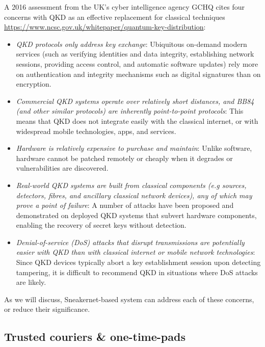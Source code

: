 \documentclass[twocolumn, aps, rmp, amsmath, amssymb, nofootinbib, superscriptaddress, longbibliography, floatfix, table-of-contents, eqsecnum]{revtex4-2}
\begin{document}
A 2016 assessment from the UK's cyber intelligence agency GCHQ cites four concerns with QKD as an effective replacement for classical techniques \href{https://www.ncsc.gov.uk/whitepaper/quantum-key-distribution}{https://www.ncsc.gov.uk/whitepaper/quantum-key-distribution}:
\begin{itemize}
\item \textit{QKD protocols only address key exchange}: Ubiquitous on-demand modern services (such as verifying identities and data integrity, establishing network sessions, providing access control, and automatic software updates) rely more on authentication and integrity mechanisms such as digital signatures than on encryption.
\item \textit{Commercial QKD systems operate over relatively short distances, and BB84 (and other similar protocols) are inherently point-to-point protocols}: This means that QKD does not integrate easily with the classical internet, or with widespread mobile technologies, apps, and services.
\item \textit{Hardware is relatively expensive to purchase and maintain}: Unlike software, hardware cannot be patched remotely or cheaply when it degrades or vulnerabilities are discovered.
\item \textit{Real-world QKD systems are built from classical components (e.g sources, detectors, fibres, and ancillary classical network devices), any of which may prove a point of failure}: A number of attacks have been proposed and demonstrated on deployed QKD systems that subvert hardware components, enabling the recovery of secret keys without detection.
\item \textit{Denial-of-service (DoS) attacks that disrupt transmissions are potentially easier with QKD than with classical internet or mobile network technologies}: Since QKD devices typically abort a key establishment session upon detecting tampering, it is difficult to recommend QKD in situations where DoS attacks are likely.
\end{itemize}

As we will discuss, Sneakernet-based system can address each of these concerns, or reduce their significance.

\subsection{Trusted couriers \& one-time-pads}
\end{document}

